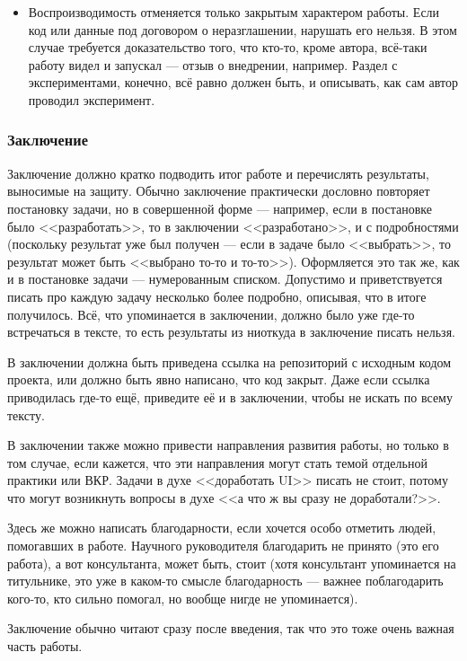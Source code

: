 \documentclass{article}
\begin{document}
\begin{itemize}
    \item Воспроизводимость отменяется только закрытым характером работы. Если код или данные под договором о неразглашении, нарушать его нельзя. В этом случае требуется доказательство того, что кто-то, кроме автора, всё-таки работу видел и запускал --- отзыв о внедрении, например. Раздел с экспериментами, конечно, всё равно должен быть, и описывать, как сам автор проводил эксперимент.
\end{itemize}

\subsubsection{Заключение}

Заключение должно кратко подводить итог работе и перечислять результаты, выносимые на защиту. Обычно заключение практически дословно повторяет постановку задачи, но в совершенной форме --- например, если в постановке было <<разработать>>, то в заключении <<разработано>>, и с подробностями (поскольку результат уже был получен --- если в задаче было <<выбрать>>, то результат может быть <<выбрано то-то и то-то>>). Оформляется это так же, как и в постановке задачи --- нумерованным списком. Допустимо и приветствуется писать про каждую задачу несколько более подробно, описывая, что в итоге получилось. Всё, что упоминается в заключении, должно было уже где-то встречаться в тексте, то есть результаты из ниоткуда в заключение писать нельзя.

В заключении должна быть приведена ссылка на репозиторий с исходным кодом проекта, или должно быть явно написано, что код закрыт. Даже если ссылка приводилась где-то ещё, приведите её и в заключении, чтобы не искать по всему тексту.

В заключении также можно привести направления развития работы, но только в том случае, если кажется, что эти направления могут стать темой отдельной практики или ВКР. Задачи в духе <<доработать UI>> писать не стоит, потому что могут возникнуть вопросы в духе <<а что ж вы сразу не доработали?>>.

Здесь же можно написать благодарности, если хочется особо отметить людей, помогавших в работе. Научного руководителя благодарить не принято (это его работа), а вот консультанта, может быть, стоит (хотя консультант упоминается на титульнике, это уже в каком-то смысле благодарность --- важнее поблагодарить кого-то, кто сильно помогал, но вообще нигде не упоминается). 

Заключение обычно читают сразу после введения, так что это тоже очень важная часть работы.
\end{document}
